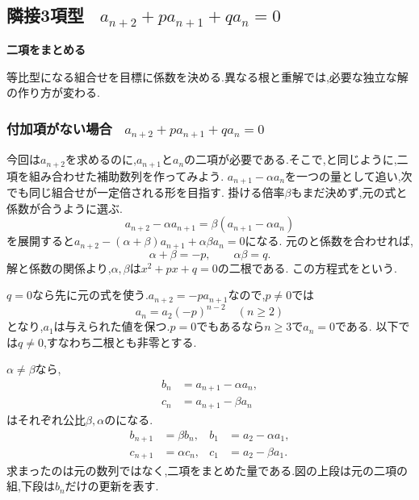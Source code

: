 
\subsection{\texorpdfstring{隣接3項型 \, $\displaystyle a_{n+2}+pa_{n+1}+qa_n=0$}{隣接3項型}}\label{節：隣接3項間漸化式型}
  \begin{bookpoint}
    \textbf{二項をまとめる}\par
    等比型になる組合せを目標に係数を決める.異なる根と重解では,必要な独立な解の作り方が変わる.
  \end{bookpoint}

  \subsubsection{\texorpdfstring{付加項がない場合 \, $\displaystyle a_{n+2}+pa_{n+1}+qa_n=0$}{付加項がない場合}}\label{節：二次特性方程式型}
    今回は$a_{n+2}$を求めるのに,$a_{n+1}$と$a_n$の二項が必要である.そこで,と同じように,二項を組み合わせた補助数列を作ってみよう.
    $a_{n+1}-\alpha a_n$を一つの量として追い,次でも同じ組合せが一定倍される形を目指す.
    掛ける倍率$\beta$もまだ決めず,元の式と係数が合うように選ぶ.
    \[
      a_{n+2}-\alpha a_{n+1}=\beta(a_{n+1}-\alpha a_n)
    \]
    を展開すると$a_{n+2}-(\alpha+\beta)a_{n+1}+\alpha\beta a_n=0$になる.
    元のと係数を合わせれば,
    \[
      \alpha+\beta=-p,\qquad\alpha\beta=q.
    \]
    解と係数の関係より,$\alpha,\beta$は$x^2+px+q=0$の二根である.
    この方程式をという.

    $q=0$なら先に元の式を使う.$a_{n+2}=-pa_{n+1}$なので,$p\ne0$では
    \[
      a_n=a_2(-p)^{n-2}\quad(n\ge2)
    \]
    となり,$a_1$は与えられた値を保つ.$p=0$でもあるなら$n\ge3$で$a_n=0$である.
    以下では$q\ne0$,すなわち二根とも非零とする.

    $\alpha\ne\beta$なら,
    \[
      \begin{aligned}
        b_n&=a_{n+1}-\alpha a_n,\\
        c_n&=a_{n+1}-\beta a_n
      \end{aligned}
    \]
    はそれぞれ公比$\beta,\alpha$のになる.
    \begin{align*}
      b_{n+1}&=\beta b_n,& b_1&=a_2-\alpha a_1,\\
      c_{n+1}&=\alpha c_n,& c_1&=a_2-\beta a_1.
    \end{align*}
    求まったのは元の数列ではなく,二項をまとめた量である.図の上段は元の二項の組,下段は$b_n$だけの更新を表す.
    \BookFigThreeTerm

